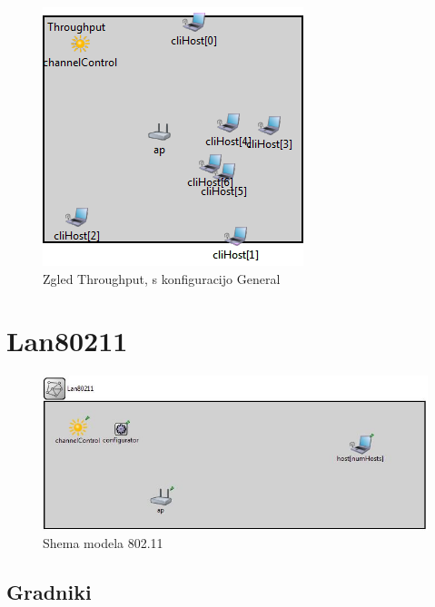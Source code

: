 \documentclass[a4paper,11pt]{article}
\begin{document}
\begin{figure}[htbp]
    \begin{center}
        \includegraphics[scale=0.8]{img/zgledi/throughput_general.png}
        \caption{Zgled Throughput, s konfiguracijo General}
	\label{image:throughputgeneral}
    \end{center}
\end{figure}





\section{Lan80211}


\begin{figure}[htbp]
    \begin{center}
        \includegraphics[scale=0.8]{img/lan80211.jpg}
        \caption{Shema modela 802.11}
	\label{image:lan80211}
    \end{center}
\end{figure}


\subsection{Gradniki}
\end{document}
